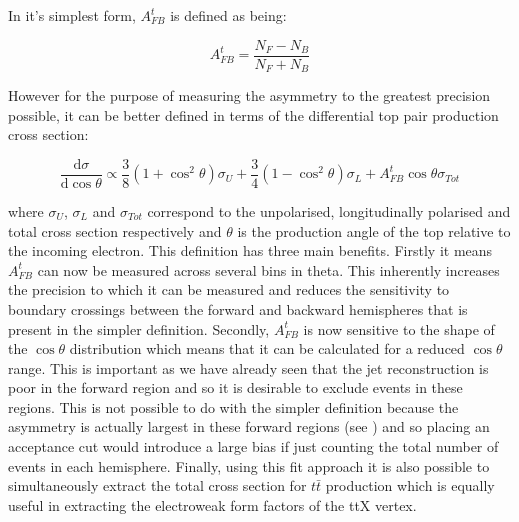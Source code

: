 In it's simplest form, $A_{FB}^t$ is defined as being:

\begin{equation}
A_{FB}^t=\frac{N_F-N_B}{N_F+N_B}
\end{equation}

However for the purpose of measuring the asymmetry to the greatest precision possible, it can be better defined in terms of the differential top pair production cross section\cite{PhysRevD.25.1218}:

\begin{equation}
  \label{eq:afbfit}
\frac{\mathrm{d}\sigma}{\mathrm{d}\cos\theta} \propto \frac{3}{8}(1+\cos^{2}\theta)\sigma_{U} + \frac{3}{4}(1-\cos^{2}\theta)\sigma_{L} + A_{FB}^{t}\cos\theta\sigma_{Tot}
\end{equation}

where $\sigma_U$, $\sigma_L$ and $\sigma_{Tot}$ correspond to the unpolarised, longitudinally polarised and total cross section respectively and $\theta$ is the production angle of the top relative to the incoming electron. This definition has three main benefits. Firstly it means $A_{FB}^t$ can now be measured across several bins in theta. This inherently increases the precision to which it can be measured and reduces the sensitivity to boundary crossings between the forward and backward hemispheres that is present in the simpler definition. Secondly, $A_{FB}^t$ is now sensitive to the shape of the $\cos\theta$ distribution which means that it can be calculated for a reduced $\cos\theta$ range. This is important as we have already seen that the jet reconstruction is poor in the forward region and so it is desirable to exclude events in these regions. This is not possible to do with the simpler definition because the asymmetry is actually largest in these forward regions (see ) and so placing an acceptance cut would introduce a large bias if just counting the total number of events in each hemisphere. Finally, using this fit approach it is also possible to simultaneously extract the total cross section for $t\bar{t}$ production which is equally useful in extracting the electroweak form factors of the ttX vertex.

